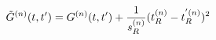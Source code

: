 \begin{equation}
\tilde{G}^{(n)}(t,t')= G^{(n)}(t,t')+{1\over s_R^{(n)}}(t_R^{(n)}-t_R^{'(n)})^2
\end{equation}

